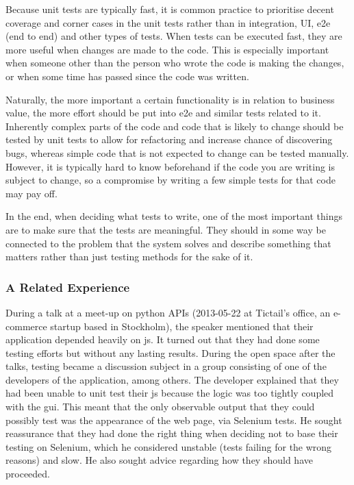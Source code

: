 \documentclass[11pt]{article}
\begin{document}
Because unit tests are typically fast, it is common practice to prioritise decent coverage and corner cases in the unit tests rather than in integration, UI, e2e (end to end) and other types of tests. When tests can be executed fast, they are more useful when changes are made to the code. This is especially important when someone other than the person who wrote the code is making the changes, or when some time has passed since the code was written. \cite[questions~22-24]{Stenmark} %

Naturally, the more important a certain functionality is in relation to business value, the more effort should be put into e2e and similar tests related to it. Inherently complex parts of the code and code that is likely to change should be tested by unit tests to allow for refactoring and increase chance of discovering bugs, whereas simple code that is not expected to change can be tested manually. However, it is typically hard to know beforehand if the code you are writing is subject to change, so a compromise by writing a few simple tests for that code may pay off. \cite[questions~28-29 and 33]{Stenmark}

In the end, when deciding what tests to write, one of the most important things are to make sure that the tests are meaningful. They should in some way be connected to the problem that the system solves and describe something that matters rather than just testing methods for the sake of it. \cite[questions~17-18]{Ahnve}

\subsubsection{A Related Experience}
\label{subsec:openspace}

During a talk at a meet-up on python APIs (2013-05-22 at Tictail's office, an e-commerce startup based in Stockholm), the speaker mentioned that their application depended heavily on \gls{js}. It turned out that they had done some testing efforts but without any lasting results. During the open space after the talks, testing became a discussion subject in a group consisting of one of the developers of the application, among others. The developer explained that they had been unable to unit test their \gls{js} because the logic was too tightly coupled with the \gls{gui}. This meant that the only observable output that they could possibly test was the appearance of the web page, via Selenium tests. He sought reassurance that they had done the right thing when deciding not to base their testing on Selenium, which he considered unstable (tests failing for the wrong reasons) and slow. He also sought advice regarding how they should have proceeded.
\end{document}
